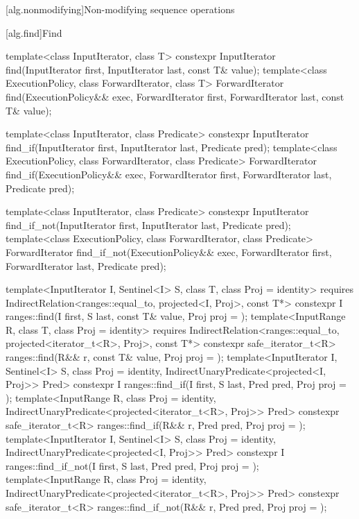 [alg.nonmodifying]{Non-modifying sequence operations}

\setcounter{subsection}{4}
[alg.find]{Find}

%
%
%
\begin{itemdecl}
template<class InputIterator, class T>
  constexpr InputIterator find(InputIterator first, InputIterator last,
                               const T& value);
template<class ExecutionPolicy, class ForwardIterator, class T>
  ForwardIterator find(ExecutionPolicy&& exec, ForwardIterator first, ForwardIterator last,
                       const T& value);

template<class InputIterator, class Predicate>
  constexpr InputIterator find_if(InputIterator first, InputIterator last,
                                  Predicate pred);
template<class ExecutionPolicy, class ForwardIterator, class Predicate>
  ForwardIterator find_if(ExecutionPolicy&& exec, ForwardIterator first, ForwardIterator last,
                          Predicate pred);

template<class InputIterator, class Predicate>
  constexpr InputIterator find_if_not(InputIterator first, InputIterator last,
                                      Predicate pred);
template<class ExecutionPolicy, class ForwardIterator, class Predicate>
  ForwardIterator find_if_not(ExecutionPolicy&& exec,
                              ForwardIterator first, ForwardIterator last,
                              Predicate pred);

template<InputIterator I, Sentinel<I> S, class T, class Proj = identity>
 requires IndirectRelation<ranges::equal_to, projected<I, Proj>, const T*>
 constexpr I ranges::find(I first, S last, const T& value, Proj proj = {});
template<InputRange R, class T, class Proj = identity>
 requires IndirectRelation<ranges::equal_to, projected<iterator_t<R>, Proj>, const T*>
 constexpr safe_iterator_t<R>
   ranges::find(R&& r, const T& value, Proj proj = {});
template<InputIterator I, Sentinel<I> S, class Proj = identity,
        IndirectUnaryPredicate<projected<I, Proj>> Pred>
 constexpr I ranges::find_if(I first, S last, Pred pred, Proj proj = {});
template<InputRange R, class Proj = identity,
        IndirectUnaryPredicate<projected<iterator_t<R>, Proj>> Pred>
 constexpr safe_iterator_t<R>
   ranges::find_if(R&& r, Pred pred, Proj proj = {});
template<InputIterator I, Sentinel<I> S, class Proj = identity,
        IndirectUnaryPredicate<projected<I, Proj>> Pred>
 constexpr I ranges::find_if_not(I first, S last, Pred pred, Proj proj = {});
template<InputRange R, class Proj = identity,
        IndirectUnaryPredicate<projected<iterator_t<R>, Proj>> Pred>
 constexpr safe_iterator_t<R>
   ranges::find_if_not(R&& r, Pred pred, Proj proj = {});
\end{itemdecl}

